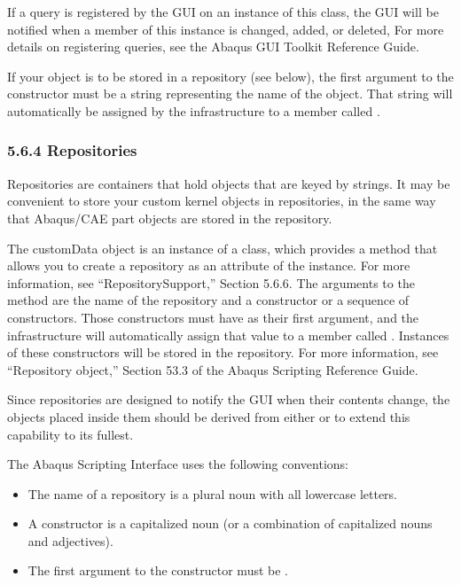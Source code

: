 \documentclass[letterpaper,10pt,english]{sphinxmanual}
\begin{document}
If a query is registered by the GUI on an instance of this class, the GUI will be notified when a member of this instance is changed, added, or deleted, For more details on registering queries, see the Abaqus GUI Toolkit Reference Guide.

If your object is to be stored in a repository (see below), the first argument to the constructor must be a string representing the name of the object. That string will automatically be assigned by the infrastructure to a member called .


\subsubsection{5.6.4 Repositories}
\label{\detokenize{abq_script_guide:repositories}}
Repositories are containers that hold objects that are keyed by strings. It may be convenient to store your custom kernel objects in repositories, in the same way that Abaqus/CAE part objects are stored in the  repository.

The customData object is an instance of a  class, which provides a  method that allows you to create a repository as an attribute of the instance. For more information, see “RepositorySupport,” Section 5.6.6. The arguments to the  method are the name of the repository and a constructor or a sequence of constructors. Those constructors must have  as their first argument, and the infrastructure will automatically assign that value to a member called . Instances of these constructors will be stored in the repository. For more information, see “Repository object,” Section 53.3 of the Abaqus Scripting Reference Guide.

Since repositories are designed to notify the GUI when their contents change, the objects placed inside them should be derived from either  or  to extend this capability to its fullest.

The Abaqus Scripting Interface uses the following conventions:
\begin{itemize}
\item {} 
The name of a repository is a plural noun with all lowercase letters.

\item {} 
A constructor is a capitalized noun (or a combination of capitalized nouns and adjectives).

\item {} 
The first argument to the constructor must be .

\end{itemize}
\end{document}
